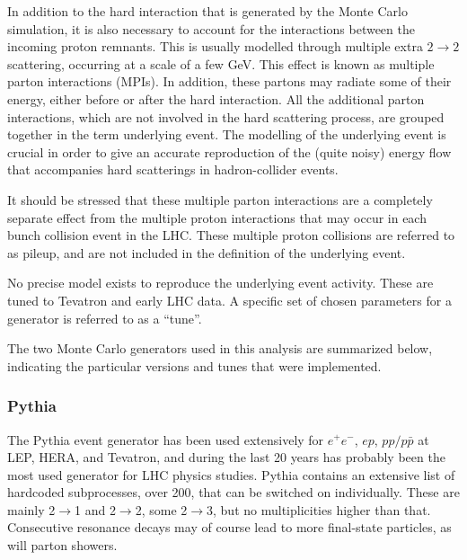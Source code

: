 In addition to the hard interaction that is generated by the Monte Carlo
simulation, it is also necessary to account for the interactions between the incoming proton  remnants. This is usually modelled through multiple extra $2\rightarrow 2$ scattering, occurring at a scale of a few GeV. This effect is known as multiple parton interactions (MPIs). In addition, these partons may radiate some of their energy, either before or after the hard interaction.  All the additional parton interactions, which are not involved in the hard scattering process, are grouped together in the term underlying event. The modelling of the underlying event is crucial in order to give an accurate reproduction of the (quite noisy) energy flow that accompanies hard scatterings in hadron-collider events.

It should be stressed that these multiple parton interactions are a completely separate effect from the multiple proton interactions that may occur in each bunch collision event in the LHC. These multiple proton collisions are referred to as pileup, and are not included in the definition of the underlying event. 

No precise model exists to reproduce the underlying event activity. %
These are tuned to Tevatron and early LHC data.
A specific set of chosen parameters for a generator is referred to as a ``tune''.  

The two Monte Carlo generators used in this analysis are summarized below, indicating the particular versions and tunes that were implemented.


\subsubsection{Pythia}

The {\sc Pythia} event generator has been used extensively for $e^+ e^-$, $ep$, $pp/p\bar{p}$ at LEP, HERA, and Tevatron, and during the last 20 years has probably been the most used generator for LHC physics studies.  {\sc Pythia} contains an extensive list of hardcoded subprocesses, over 200, that can be switched on individually. These are mainly 2$\rightarrow$1 and  2$\rightarrow$2, some  2$\rightarrow$3, but no multiplicities higher than that. Consecutive resonance decays may of course lead to more final-state particles, as will parton showers.

